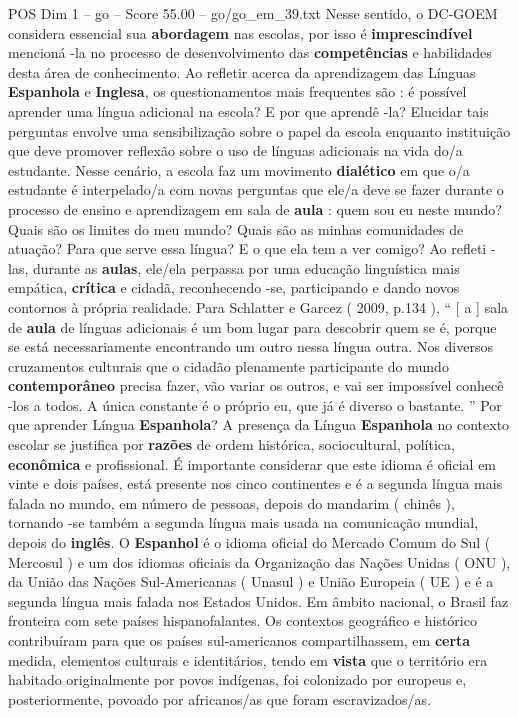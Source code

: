 \begin{textsample}{POS Dim 1 – go – Score 55.00 – go/go\_em\_39.txt}
Nesse sentido, o DC-GOEM considera essencial sua \textbf{abordagem} nas escolas, por isso é \textbf{imprescindível} mencioná -la no processo de desenvolvimento das \textbf{competências} e habilidades desta área de conhecimento.
Ao refletir acerca da aprendizagem das Línguas \textbf{Espanhola} e \textbf{Inglesa}, os questionamentos mais frequentes são : é possível aprender uma língua adicional na escola?
E por que aprendê -la?
Elucidar tais perguntas envolve uma sensibilização sobre o papel da escola enquanto instituição que deve promover reflexão sobre o uso de línguas adicionais na vida do/a estudante.
Nesse cenário, a escola faz um movimento \textbf{dialético} em que o/a estudante é interpelado/a com novas perguntas que ele/a deve se fazer durante o processo de ensino e aprendizagem em sala de \textbf{aula} : quem sou eu neste mundo?
Quais são os limites do meu mundo?
Quais são as minhas comunidades de atuação?
Para que serve essa língua?
E o que ela tem a ver comigo?
Ao refleti -las, durante as \textbf{aulas}, ele/ela perpassa por uma educação linguística mais empática, \textbf{crítica} e cidadã, reconhecendo -se, participando e dando novos contornos à própria realidade.
Para Schlatter e Garcez ( 2009, p.134 ), “ [ a ] sala de \textbf{aula} de línguas adicionais é um bom lugar para descobrir quem se é, porque se está necessariamente encontrando um outro nessa língua outra.
Nos diversos cruzamentos culturais que o cidadão plenamente participante do mundo \textbf{contemporâneo} precisa fazer, vão variar os outros, e vai ser impossível conhecê -los a todos.
A única constante é o próprio eu, que já é diverso o bastante. ” Por que aprender Língua \textbf{Espanhola}?
A presença da Língua \textbf{Espanhola} no contexto escolar se justifica por \textbf{razões} de ordem histórica, sociocultural, política, \textbf{econômica} e profissional.
É importante considerar que este idioma é oficial em vinte e dois países, está presente nos cinco continentes e é a segunda língua mais falada no mundo, em número de pessoas, depois do mandarim ( chinês ), tornando -se também a segunda língua mais usada na comunicação mundial, depois do \textbf{inglês}.
O \textbf{Espanhol} é o idioma oficial do Mercado Comum do Sul ( Mercosul ) e um dos idiomas oficiais da Organização das Nações Unidas ( ONU ), da União das Nações Sul-Americanas ( Unasul ) e União Europeia ( UE ) e é a segunda língua mais falada nos Estados Unidos.
Em âmbito nacional, o Brasil faz fronteira com sete países hispanofalantes.
Os contextos geográfico e histórico contribuíram para que os países sul-americanos compartilhassem, em \textbf{certa} medida, elementos culturais e identitários, tendo em \textbf{vista} que o território era habitado originalmente por povos indígenas, foi colonizado por europeus e, posteriormente, povoado por africanos/as que foram escravizados/as.

\end{textsample}
